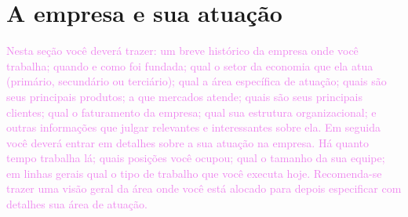 \section{A empresa e sua atuação }
\label{sec:atuacao}

\textcolor{violet}{
Nesta seção você deverá trazer: um breve histórico da empresa onde você trabalha; quando e como foi fundada; qual o setor da economia que ela atua (primário, secundário ou terciário); qual a área específica de atuação; quais são seus principais produtos; a que mercados atende; quais são seus principais clientes; qual o faturamento da empresa; qual sua estrutura organizacional; e outras informações que julgar relevantes e interessantes sobre ela. Em seguida você deverá entrar em detalhes sobre a sua atuação na empresa. Há quanto tempo trabalha lá; quais posições você ocupou; qual o tamanho da sua equipe; em linhas gerais qual o tipo de trabalho que você executa hoje. Recomenda-se trazer uma visão geral da área onde você está alocado para depois especificar com detalhes sua área de atuação.}